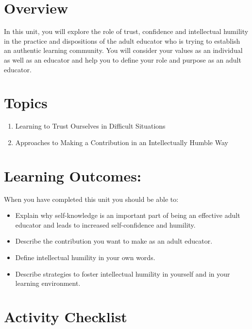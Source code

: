 \documentclass[
]{book}
\providecommand{\tightlist}{%
  \setlength{\itemsep}{0pt}\setlength{\parskip}{0pt}}
\begin{document}
\hypertarget{overview-8}{%
\section*{Overview}\label{overview-8}}

In this unit, you will explore the role of trust, confidence and intellectual humility in the practice and dispositions of the adult educator who is trying to establish an authentic learning community. You will consider your values as an individual as well as an educator and help you to define your role and purpose as an adult educator.

\hypertarget{topics-8}{%
\section*{Topics}\label{topics-8}}

\begin{enumerate}
\def\labelenumi{\arabic{enumi}.}
\tightlist
\item
  Learning to Trust Ourselves in Difficult Situations
\item
  Approaches to Making a Contribution in an Intellectually Humble Way
\end{enumerate}

\hypertarget{learning-outcomes-8}{%
\section*{Learning Outcomes:}\label{learning-outcomes-8}}

When you have completed this unit you should be able to:

\begin{itemize}
\tightlist
\item
  Explain why self-knowledge is an important part of being an effective adult educator and leads to increased self-confidence and humility.
\item
  Describe the contribution you want to make as an adult educator.
\item
  Define intellectual humility in your own words.
\item
  Describe strategies to foster intellectual humility in yourself and in your learning environment.
\end{itemize}

\hypertarget{activity-checklist-8}{%
\section*{Activity Checklist}\label{activity-checklist-8}}
\end{document}
